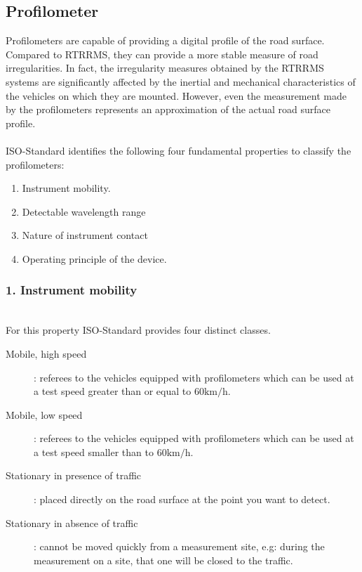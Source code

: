 \documentclass[tesi]{subfiles}
\begin{document}
		\subsection{Profilometer}\label{ssc:profilometers}
\noindent Profilometers are capable of providing a digital profile of the road surface. Compared to RTRRMS, they can provide a more stable measure of road irregularities. In fact, the irregularity measures obtained by the RTRRMS systems are significantly affected by the inertial and mechanical characteristics of the vehicles on which they are mounted. However, even the measurement made by the profilometers represents an approximation of the actual road surface profile.\cite{sayers1996interpretation}\\\\
ISO-Standard\cite{iso_standard} identifies the following four fundamental properties to classify the profilometers:
\begin{enumerate}
\item Instrument mobility.
\item Detectable wavelength range
\item Nature of instrument contact
\item Operating principle of the device.
\end{enumerate}
\clearpage
\noindent

\subsubsection{1. Instrument mobility}\leavevmode\\
For this property ISO-Standard \cite{iso_standard} provides four distinct classes.
\begin{description}
\item [Mobile, high speed]: referees to the vehicles equipped with profilometers which can be used at a test speed greater than or equal to $\num{60} \si{\km\per\hour}$.
\item [Mobile, low speed]: referees to the vehicles equipped with profilometers which can be used at a test speed smaller than to $\num{60} \si{\km\per\hour}$.
\item [Stationary in presence of traffic]: placed directly on the road surface at the point you want to detect.
\item [Stationary in absence of traffic]: cannot be moved quickly from a measurement site, e.g: during the measurement on a site, that one will be closed to the traffic.
\end{description}
\end{document}

